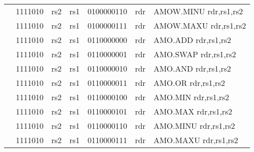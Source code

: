 \begin{table}[p]
\begin{small}
\begin{center}
\begin{tabular}{rcccccccccl}
&
\multicolumn{2}{|c|}{1111010} &
\multicolumn{1}{c|}{rs2} &
\multicolumn{1}{c|}{rs1} &
\multicolumn{4}{c|}{0100000110} &
\multicolumn{1}{c|}{rdr} & AMOW.MINU rdr,rs1,rs2 \\
\cline{2-10}
  

&
\multicolumn{2}{|c|}{1111010} &
\multicolumn{1}{c|}{rs2} &
\multicolumn{1}{c|}{rs1} &
\multicolumn{4}{c|}{0100000111} &
\multicolumn{1}{c|}{rdr} & AMOW.MAXU rdr,rs1,rs2 \\
\cline{2-10}
  

&
\multicolumn{2}{|c|}{1111010} &
\multicolumn{1}{c|}{rs2} &
\multicolumn{1}{c|}{rs1} &
\multicolumn{4}{c|}{0110000000} &
\multicolumn{1}{c|}{rdr} & AMO.ADD rdr,rs1,rs2 \\
\cline{2-10}
  

&
\multicolumn{2}{|c|}{1111010} &
\multicolumn{1}{c|}{rs2} &
\multicolumn{1}{c|}{rs1} &
\multicolumn{4}{c|}{0110000001} &
\multicolumn{1}{c|}{rdr} & AMO.SWAP rdr,rs1,rs2 \\
\cline{2-10}
  

&
\multicolumn{2}{|c|}{1111010} &
\multicolumn{1}{c|}{rs2} &
\multicolumn{1}{c|}{rs1} &
\multicolumn{4}{c|}{0110000010} &
\multicolumn{1}{c|}{rdr} & AMO.AND rdr,rs1,rs2 \\
\cline{2-10}
  

&
\multicolumn{2}{|c|}{1111010} &
\multicolumn{1}{c|}{rs2} &
\multicolumn{1}{c|}{rs1} &
\multicolumn{4}{c|}{0110000011} &
\multicolumn{1}{c|}{rdr} & AMO.OR rdr,rs1,rs2 \\
\cline{2-10}
  

&
\multicolumn{2}{|c|}{1111010} &
\multicolumn{1}{c|}{rs2} &
\multicolumn{1}{c|}{rs1} &
\multicolumn{4}{c|}{0110000100} &
\multicolumn{1}{c|}{rdr} & AMO.MIN rdr,rs1,rs2 \\
\cline{2-10}
  

&
\multicolumn{2}{|c|}{1111010} &
\multicolumn{1}{c|}{rs2} &
\multicolumn{1}{c|}{rs1} &
\multicolumn{4}{c|}{0110000101} &
\multicolumn{1}{c|}{rdr} & AMO.MAX rdr,rs1,rs2 \\
\cline{2-10}
  

&
\multicolumn{2}{|c|}{1111010} &
\multicolumn{1}{c|}{rs2} &
\multicolumn{1}{c|}{rs1} &
\multicolumn{4}{c|}{0110000110} &
\multicolumn{1}{c|}{rdr} & AMO.MINU rdr,rs1,rs2 \\
\cline{2-10}
  

&
\multicolumn{2}{|c|}{1111010} &
\multicolumn{1}{c|}{rs2} &
\multicolumn{1}{c|}{rs1} &
\multicolumn{4}{c|}{0110000111} &
\multicolumn{1}{c|}{rdr} & AMO.MAXU rdr,rs1,rs2 \\
\cline{2-10}
  

\end{tabular}
\end{center}
\end{small}

\label{instr-table}
\end{table}
  

